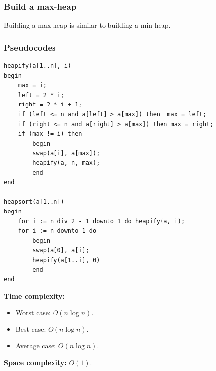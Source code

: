 \documentclass[12pt,a4paper]{article}
\begin{document}
\subsubsection{Build a max-heap}
Building a max-heap is similar to building a min-heap.
\subsubsection{Pseudocodes}
\lstset{language=Pascal} 
\begin{lstlisting}
heapify(a[1..n], i)
begin
	max = i;
	left = 2 * i;
	right = 2 * i + 1;
	if (left <= n and a[left] > a[max]) then  max = left;
	if (right <= n and a[right] > a[max]) then max = right;
	if (max != i) then 
		begin
		swap(a[i], a[max]);
		heapify(a, n, max);
		end
end

heapsort(a[1..n])
begin
	for i := n div 2 - 1 downto 1 do heapify(a, i);
	for i := n downto 1 do 
		begin
		swap(a[0], a[i];
		heapify(a[1..i], 0)
		end
end
\end{lstlisting}
\textbf{Time complexity:} \cite{heap}
\begin{itemize}
\item Worst case: $O \left( {n \log n} \right).$
\item Best case: $O \left( {n \log n} \right).$
\item Average case: $O \left( {n \log n} \right).$
\end{itemize}
\textbf{Space complexity:} $O \left( {1} \right).$ \cite{heap}
\end{document}
